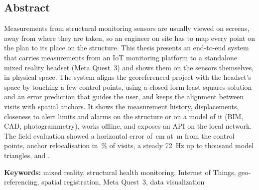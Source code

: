 \begin{otherlanguage}{english}
\chapter*{Abstract}

Measurements from structural monitoring sensors are usually viewed on screens, away from where they are taken, so an engineer on site has to map every point on the plan to its place on the structure. This thesis presents an end-to-end system that carries measurements from an IoT monitoring platform to a standalone mixed reality headset (Meta Quest~3) and shows them on the sensors themselves, in physical space. The system aligns the georeferenced project with the headset's space by touching a few control points, using a closed-form least-squares solution and an error prediction that guides the user, and keeps the alignment between visits with spatial anchors. It shows the measurement history, displacements, closeness to alert limits and alarms on the structure or on a model of it (BIM, CAD, photogrammetry), works offline, and exposes an API on the local network. The field evaluation showed a horizontal error of \,cm at \,m from the control points, anchor relocalisation in \,\% of visits, a steady \SI{72}{Hz} up to  thousand model triangles, and .


\vspace{1em}
\noindent\textbf{Keywords:} mixed reality, structural health monitoring, Internet of Things, georeferencing, spatial registration, Meta Quest~3, data visualization
\end{otherlanguage}
